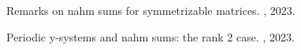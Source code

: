 \documentclass[10pt,a4paper,sans]{moderncv}        %
\begin{document}

%
%



\renewcommand{\refname}{Preprints}
\begin{thebibliography}{1}

 Remarks on nahm sums for symmetrizable matrices.
, 2023.

   Periodic y-systems and nahm sums: the rank 2 case.
, 2023.


\end{thebibliography}
\end{document}
